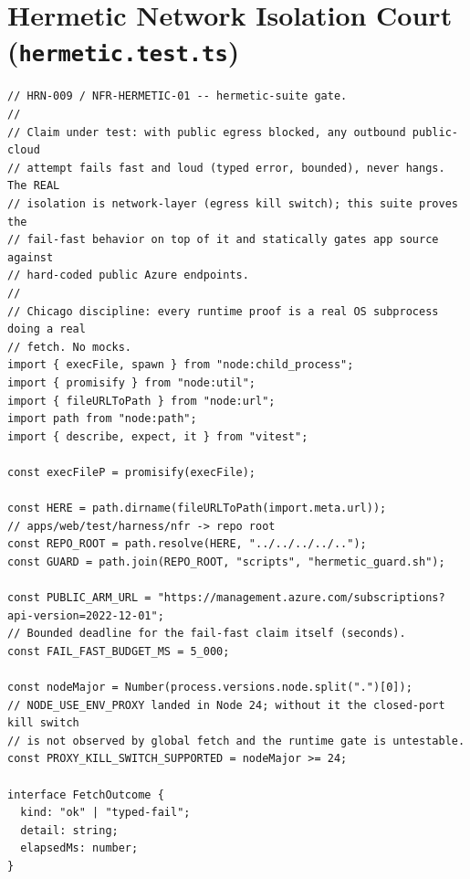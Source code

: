 \documentclass[10pt,twoside,openany]{book}
\theoremstyle{plain}
\theoremstyle{definition}
\theoremstyle{remark}
\begin{document}
\section{Hermetic Network Isolation Court (\texttt{hermetic.test.ts})}
\begin{lstlisting}[caption={apps/web/test/harness/nfr/hermetic.test.ts}]
// HRN-009 / NFR-HERMETIC-01 -- hermetic-suite gate.
//
// Claim under test: with public egress blocked, any outbound public-cloud
// attempt fails fast and loud (typed error, bounded), never hangs. The REAL
// isolation is network-layer (egress kill switch); this suite proves the
// fail-fast behavior on top of it and statically gates app source against
// hard-coded public Azure endpoints.
//
// Chicago discipline: every runtime proof is a real OS subprocess doing a real
// fetch. No mocks.
import { execFile, spawn } from "node:child_process";
import { promisify } from "node:util";
import { fileURLToPath } from "node:url";
import path from "node:path";
import { describe, expect, it } from "vitest";

const execFileP = promisify(execFile);

const HERE = path.dirname(fileURLToPath(import.meta.url));
// apps/web/test/harness/nfr -> repo root
const REPO_ROOT = path.resolve(HERE, "../../../../..");
const GUARD = path.join(REPO_ROOT, "scripts", "hermetic_guard.sh");

const PUBLIC_ARM_URL = "https://management.azure.com/subscriptions?api-version=2022-12-01";
// Bounded deadline for the fail-fast claim itself (seconds).
const FAIL_FAST_BUDGET_MS = 5_000;

const nodeMajor = Number(process.versions.node.split(".")[0]);
// NODE_USE_ENV_PROXY landed in Node 24; without it the closed-port kill switch
// is not observed by global fetch and the runtime gate is untestable.
const PROXY_KILL_SWITCH_SUPPORTED = nodeMajor >= 24;

interface FetchOutcome {
  kind: "ok" | "typed-fail";
  detail: string;
  elapsedMs: number;
}


\end{lstlisting}
\end{document}
